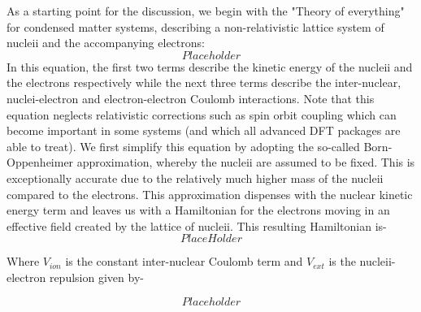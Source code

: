 \documentclass[12pt,a4paper]{article}
\begin{document}
As a starting point for the discussion, we begin with the "Theory of everything" for condensed matter systems, describing a non-relativistic lattice system of nucleii and the accompanying electrons:
\begin{equation}\label{DFT_1}
Placeholder
\end{equation}
In this equation, the first two terms describe the kinetic energy of the nucleii and the electrons respectively while the next three terms describe the inter-nuclear, nuclei-electron and electron-electron Coulomb interactions. Note that this equation neglects relativistic corrections such as spin orbit coupling which can become important in some systems (and which all advanced DFT packages are able to treat). We first simplify this equation by adopting the so-called Born-Oppenheimer approximation, whereby the nucleii are assumed to be fixed. This is exceptionally accurate due to the relatively much higher mass of the nucleii compared to the electrons. This approximation dispenses with the nuclear kinetic energy term and leaves us with a Hamiltonian for the electrons moving in an effective field created by the lattice of nucleii. This resulting Hamiltonian is-
\begin{equation}
PlaceHolder
\end{equation}

Where $V_{ion}$ is the constant inter-nuclear Coulomb term and $V_{ext}$ is the nucleii-electron repulsion given by-

\begin{equation}\label{DFT_2}
 Placeholder
 \end{equation} 
\end{document}
